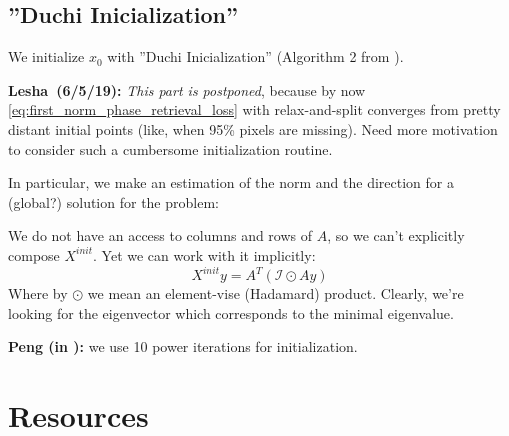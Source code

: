 \documentclass[11pt,letterpaper]{article}
\newcommand{\userId}{Lesha}
\newcommand{\Peng}[1]{\textbf{Peng (#1):}}
\newcommand{\Lesha}[1]{\textbf{\userId\ (#1):}}
\numberwithin{equation}{section} %
\numberwithin{figure}{section} %
\numberwithin{table}{section} %
\begin{document}
\subsection*{''Duchi Inicialization''} We initialize $x_0$ with ''Duchi Inicialization'' (Algorithm 2 from \cite{Duchi2017PhaseRetrival}).

\begin{tip}
    \Lesha{6/5/19} \textit{This part is postponed}, because by now \ref{eq:first_norm_phase_retrieval_loss} with relax-and-split converges from pretty distant initial points (like, when 95\% pixels are missing). Need more motivation to consider such a cumbersome initialization routine.
\end{tip}
 
 In particular, we make an estimation of the norm and the direction for a (global?) solution for the problem:



We do not have an access to columns and rows of $A$, so we can't explicitly compose $X^{init}$. Yet we can work with it implicitly: 
\[
    X^{init}y = A^T(\mathcal{I}\odot Ay)
\]
Where by $\odot$ we mean an element-vise (Hadamard) product. 
Clearly, we're looking for the eigenvector which corresponds to the minimal eigenvalue.
\begin{tip}
    \Peng{in \cite{Zheng2018RelaxAndSplit}} we use 10 power iterations for initialization.
\end{tip}

\section{Resources}



\clearpage
\end{document}
